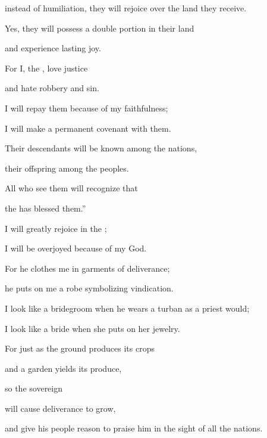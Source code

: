 {\par }{\Q instead of humiliation,
they will rejoice
over the land
they receive.
\par }{\Q Yes, they will possess
a double
portion
in their land
\par }{\Q and experience lasting
joy.
\par }{\Q {}For
I,
the {}, love
justice
\par }{\Q and hate
robbery
and sin.
\par }{\Q I will repay
them because
of my faithfulness;
\par }{\Q I will make
a permanent
covenant with them.
\par }{\Q {}Their descendants
will be known
among the nations,
\par }{\Q their offspring
among
the peoples.
\par }{\Q All
who see
them will recognize
that
\par }{\Q the {}
has blessed them.”
\par }{\Q {}I will
greatly
rejoice in
the {};
\par }{\Q I will be overjoyed because
of my God.
\par }{\Q For
he clothes
me
in garments
of deliverance;
\par }{\Q he puts on me
a robe
symbolizing
vindication.
\par }{\Q I look like a bridegroom
when
he wears
a turban
as
a priest
would;
\par }{\Q I look like a bride
when
she puts
on her jewelry.
\par }{\Q {}For just as
the ground
produces
its crops
\par }{\Q and a garden
yields
its produce,
\par }{\Q so
the sovereign

{}
will cause deliverance
to grow,
\par }{\Q and give his people reason to praise
him in the sight
of all
the nations.

}
